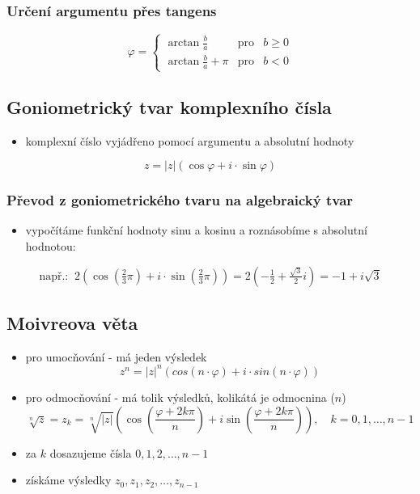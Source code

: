     \subsubsection{Určení argumentu přes tangens}
        $$
            \varphi = \left\{\begin{array}{rcl}
                \arctan{\frac{b}{a}}        & \mbox{pro} & b \geq 0\\
                \arctan{\frac{b}{a}}+\pi    & \mbox{pro} & b < 0
            \end{array}\right.
        $$
\subsection{Goniometrický tvar komplexního čísla}
    \begin{itemize}
        \item komplexní číslo vyjádřeno pomocí argumentu a absolutní hodnoty
    \end{itemize}
    $$
        z=|z|(\cos{\varphi}+i\cdot \sin{\varphi})
    $$
    \subsubsection{Převod z goniometrického tvaru na algebraický tvar}
    \begin{itemize}
        \item vypočítáme funkční hodnoty sinu a kosinu a roznásobíme s absolutní hodnotou:
    \end{itemize}
    
    $$
        \mbox{např.:}\;\; 2(\cos({\tfrac{2}{3}\pi})+i\cdot \sin({\tfrac{2}{3}\pi})) = 2(-\tfrac{1}{2}+\tfrac{\sqrt{3}}{2}i) = -1 + i\sqrt{3}
    $$
\subsection{Moivreova věta}
    \begin{itemize}
        \item pro umocňování - má jeden výsledek
    $$
        z^n=|z|^n(cos(n \cdot \varphi)+i\cdot sin (n \cdot \varphi))
    $$
        \item pro odmocňování - má tolik výsledků, kolikátá je odmocnina ($n$)
    $$
        \sqrt[n]{z}=z_k = \sqrt[n]{|z|} \left( \cos\left( \frac{\varphi + 2k\pi}{n} \right) + i \sin\left( \frac{\varphi + 2k\pi}{n} \right) \right), \quad k = 0, 1, \dots, n-1
    $$
        \item za $k$ dosazujeme čísla $0, 1, 2, \dots, n-1$
        \item získáme výsledky $z_0, z_1, z_2, \dots, z_{n-1}$
    \end{itemize}
    
